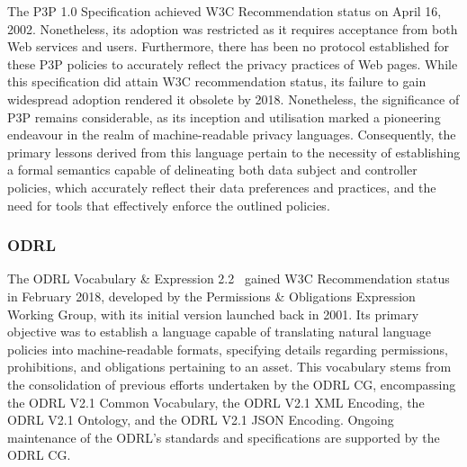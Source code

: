 The P3P 1.0 Specification achieved W3C Recommendation status on April 16, 2002.
Nonetheless, its adoption was restricted as it requires acceptance from both Web services and users.
Furthermore, there has been no protocol established for these P3P policies to accurately reflect the privacy practices of Web pages.
While this specification did attain W3C recommendation status, its failure to gain widespread adoption rendered it obsolete by 2018.
Nonetheless, the significance of P3P remains considerable, as its inception and utilisation marked a pioneering endeavour in the realm of machine-readable privacy languages. 
Consequently, the primary lessons derived from this language pertain to the necessity of establishing a formal semantics capable of delineating both data subject and controller policies, which accurately reflect their data preferences and practices, and the need for tools that effectively enforce the outlined policies.

\subsubsection{ODRL}
\label{sec:odrl}

The ODRL Vocabulary \& Expression 2.2~\citep{iannella_odrl_2018} gained W3C Recommendation status in February 2018, developed by the Permissions \& Obligations Expression Working Group, with its initial version launched back in 2001.
Its primary objective was to establish a language capable of translating natural language policies into machine-readable formats, specifying details regarding permissions, prohibitions, and obligations pertaining to an asset.
This vocabulary stems from the consolidation of previous efforts undertaken by the ODRL CG, encompassing the ODRL V2.1 Common Vocabulary, the ODRL V2.1 XML Encoding, the ODRL V2.1 Ontology, and the ODRL V2.1 JSON Encoding.
Ongoing maintenance of the ODRL's standards and specifications are supported by the ODRL CG.

